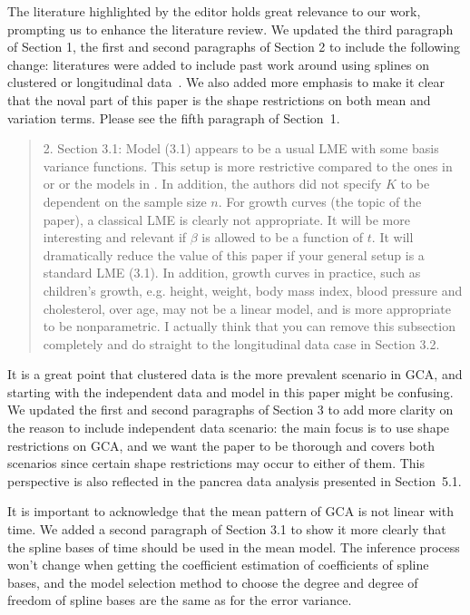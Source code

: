 \documentclass[12pt]{article}
\newenvironment{comment}%
{\begin{quotation}\noindent\small\it\ignorespaces%
  }{\end{quotation}}
\begin{document}
The literature highlighted by the editor holds great relevance to our
work, prompting us to enhance the literature review. We updated the
third paragraph of Section 1, the first and second paragraphs of
Section 2 to include the following change: literatures were added to
include past work around using splines on clustered or longitudinal
data~\cite{rice2001nonparametric, huang2002varying,
  huang2004polynomial, wu2018nonparametric}. We also added more
emphasis to make it clear that the noval part of this paper is the
shape restrictions on both mean and variation terms. Please see the
fifth paragraph of Section~1.


\begin{comment}
  2. Section 3.1: Model (3.1) appears to be a usual LME with some
  basis variance functions. This setup is more restrictive compared to
  the ones in \cite{rice2001nonparametric} or \cite{huang2002varying} or the
  models in \cite{wu2018nonparametric}. In addition, the authors did not
  specify $K$ to be dependent on the sample size $n$. For growth curves
  (the topic of the paper), a classical LME is clearly not
  appropriate. It will be more interesting and relevant if $\beta$ is
  allowed to be a function of $t$. It will dramatically reduce the
  value of this paper if your general setup is a standard LME
  (3.1). In addition, growth curves in practice, such as children's
  growth, e.g. height, weight, body mass index, blood pressure and
  cholesterol, over age, may not be a linear model, and is more
  appropriate to be nonparametric. I actually think that you can
  remove this subsection completely and do straight to the
  longitudinal data case in Section 3.2.
\end{comment}


It is a great point that clustered data is the more prevalent scenario
in GCA, and starting with the independent data and model in this paper
might be confusing. We updated the first and second paragraphs of
Section 3 to add more clarity on the reason to include independent
data scenario: the main focus is to use shape restrictions on GCA, and
we want the paper to be thorough and covers both scenarios since
certain shape restrictions may occur to either of them. This
perspective is also reflected in the pancrea data analysis presented
in Section~5.1.


It is important to acknowledge that the mean pattern of GCA is not
linear with time. We added a second paragraph of Section 3.1 to show
it more clearly that the spline bases of time should be used in the
mean model. The inference process won't change when getting the
coefficient estimation of coefficients of spline bases, and the model
selection method to choose the degree and degree of freedom of spline
bases are the same as for the error variance.
\end{document}
